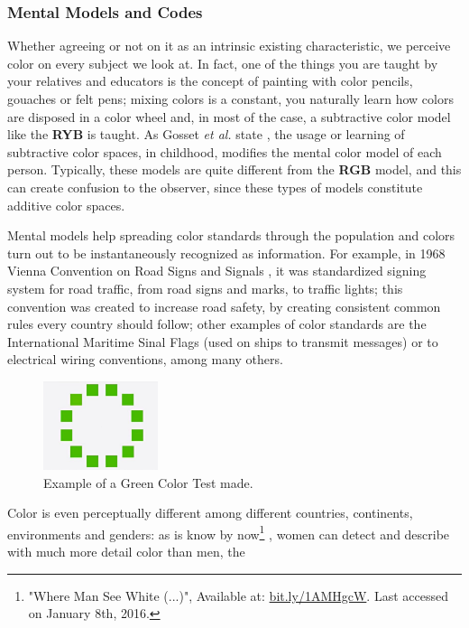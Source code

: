 \subsubsection{Mental Models and Codes}
Whether agreeing or not on it as an intrinsic existing characteristic, we perceive color on every
subject we look at. In fact, one of the things you are taught by your relatives and educators is the concept of
painting with color pencils, gouaches or felt pens; mixing colors is a constant,
you naturally learn how colors are disposed in a color wheel and, in most of the case, a subtractive color
model like the \textbf{RYB} is taught. As Gosset \emph{et al.} state \cite{Gossett2004}, the usage or learning of
subtractive color spaces, in childhood, modifies the mental color model of each person. Typically, these models are quite
different from the \textbf{RGB} model, and this can create confusion to
the observer, since these types of models constitute additive color spaces. \par
Mental models help spreading color standards through the population and colors turn out to be instantaneously
recognized as information. For example, in 1968 Vienna Convention on Road Signs and Signals \cite{Nations1995}, it was standardized signing system for road traffic, from road signs and marks, to traffic lights;
this convention was created to increase road safety, by creating consistent common rules every country
should follow; other examples of color standards are the International Maritime Sinal Flags
\cite{Agency2003} (used on ships to transmit messages) or to electrical wiring conventions, among many others. \par
%
\begin{figure}
	\centering
    \vspace{-\baselineskip}
    \includegraphics[width=0.3\textwidth]{images/background/Himba_green-color-ring.jpg}
    \caption[Himba Test: Green Color Ring]{Example of a Green Color Test made.\protect\footnotemark[10]}
    \label{fig:himba}
\end{figure}
%
Color is even perceptually different among different countries, continents, environments and genders:
as is know by now\footnote{"Where Man See White (...)", Available at:
\url {bit.ly/1AMHgcW}.
Last accessed on January 8th, 2016.} \cite{Ginter2011}, women can detect and describe with much more detail color than men, the
